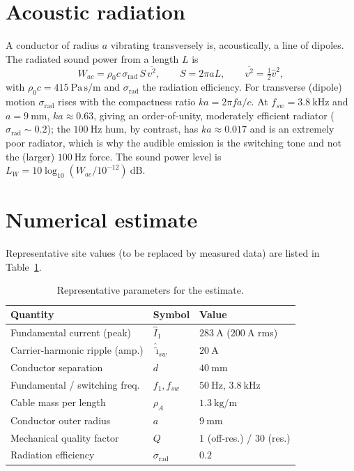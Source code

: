 \documentclass[11pt,a4paper]{article}
\begin{document}
\section{Acoustic radiation}\label{sec:acou}
A conductor of radius $a$ vibrating transversely is, acoustically, a line of
dipoles. The radiated sound power from a length $L$ is
\begin{equation}
W_{ac}=\rho_0 c\,\sigma_{\text{rad}}\,S\,\overline{v^2},
\qquad S=2\pi a L,\qquad \overline{v^2}=\tfrac12\hat v^2,
\label{eq:Wac}
\end{equation}
with $\rho_0 c=415\ \mathrm{Pa\,s/m}$ and $\sigma_{\text{rad}}$ the radiation
efficiency. For transverse (dipole) motion $\sigma_{\text{rad}}$ rises with the
compactness ratio $ka=2\pi f a/c$. At $f_{sw}=3.8\ \mathrm{kHz}$ and
$a=9\ \mathrm{mm}$, $ka\approx0.63$, giving an order-of-unity, moderately efficient
radiator ($\sigma_{\text{rad}}\sim0.2$); the $100\ \mathrm{Hz}$ hum, by contrast,
has $ka\approx0.017$ and is an extremely poor radiator, which is why the audible
emission is the switching tone and not the (larger) $100\ \mathrm{Hz}$ force. The
sound power level is $L_W=10\log_{10}(W_{ac}/10^{-12})\ \mathrm{dB}$.

\section{Numerical estimate}\label{sec:numbers}
Representative site values (to be replaced by measured data) are listed in
Table~\ref{tab:par}.

\begin{table}[h]
\centering
\caption{Representative parameters for the estimate.}
\label{tab:par}
\begin{tabular}{@{}lll@{}}
\toprule
Quantity & Symbol & Value \\
\midrule
Fundamental current (peak) & $\hat I_1$ & $283\ \mathrm{A}$ ($200\ \mathrm{A}$ rms) \\
Carrier-harmonic ripple (amp.) & $\hat{\tilde\imath}_{sw}$ & $20\ \mathrm{A}$ \\
Conductor separation & $d$ & $40\ \mathrm{mm}$ \\
Fundamental / switching freq. & $f_1,f_{sw}$ & $50\ \mathrm{Hz}$, $3.8\ \mathrm{kHz}$ \\
Cable mass per length & $\rho_A$ & $1.3\ \mathrm{kg/m}$ \\
Conductor outer radius & $a$ & $9\ \mathrm{mm}$ \\
Mechanical quality factor & $Q$ & $1$ (off-res.) / $30$ (res.) \\
Radiation efficiency & $\sigma_{\text{rad}}$ & $0.2$ \\
\bottomrule
\end{tabular}
\end{table}
\end{document}
